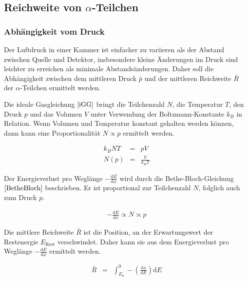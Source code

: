 \documentclass[12pt,a4paper]{scrartcl}
\numberwithin{equation}{section} %
\renewcommand{\[}{} %
\renewcommand{\]}{\noindent} %
\begin{document}
\hypertarget{reichweite-von-alpha-teilchen}{%
\subsection{\texorpdfstring{Reichweite von
\(\alpha\)-Teilchen}{Reichweite von \textbackslash alpha-Teilchen}}\label{reichweite-von-alpha-teilchen}}

\hypertarget{abhuxe4ngigkeit-vom-druck}{%
\subsubsection{Abhängigkeit vom Druck}\label{abhuxe4ngigkeit-vom-druck}}

Der Luftdruck in einer Kammer ist einfacher zu variieren als der Abstand
zwischen Quelle und Detektor, insbesondere kleine Änderungen im Druck
sind leichter zu erreichen als minimale Abstandsänderungen. Daher soll
die Abhängigkeit zwischen dem mittleren Druck \(\bar p\) und der
mittleren Reichweite \(\bar R\) der \(\alpha\)-Teilchen ermittelt
werden.

Die ideale Gasgleichung \(\eqref{iGG}\) bringt die Teilchenzahl \(N\),
die Temperatur \(T\), den Druck \(p\) und das Volumen \(V\) unter
Verwendung der Boltzmann-Konstante \(k_B\) in Relation. Wenn Volumen und
Temperatur konstant gehalten werden können, dann kann eine
Proportionalität \(N\propto p\) ermittelt werden.

\[
\begin{eqnarray}
    k_B N T &=& pV \label{iGG} \\
    N(p) &=& \frac{V}{k_B T}
\end{eqnarray}
\]

Der Energieverlust pro Weglänge \(-\frac{\mathrm dE}{\mathrm dx}\) wird
durch die Bethe-Bloch-Gleichung \(\eqref{BetheBloch}\) beschrieben. Er
ist proportional zur Teilchenzahl \(N\), folglich auch zum Druck \(p\).

\[
\begin{eqnarray}
    -\frac{\mathrm dE}{\mathrm dx}\propto N\propto p \label{dEtoP}
\end{eqnarray}
\]

Die mittlere Reichweite \(\bar R\) ist die Position, an der
Erwartungswert der Restenergie \(E_\mathrm{Rest}\) verschwindet. Daher
kann sie aus dem Energieverlust pro Weglänge
\(-\frac{\mathrm dE}{\mathrm dx}\) ermittelt werden.

\[
\begin{eqnarray}
    \bar{R} &=&
        \int_{E_0}^{0} -\left(\frac{\mathrm dx}{\mathrm dE}\right) \mathrm dE
\end{eqnarray}
\]
\end{document}
